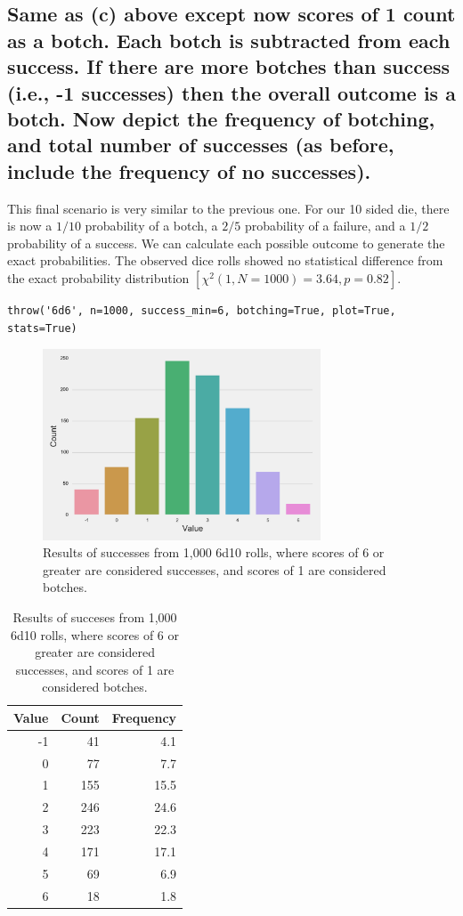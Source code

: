 \documentclass[twocolumn,letterpaper]{article}  %
\begin{document}
\subsection{Same as (c) above except now scores of 1 count as a botch. Each botch is subtracted from each success. If there are more botches than success (i.e., -1 successes) then the overall outcome is a botch. Now depict the frequency of botching, and total number of successes (as before, include the frequency of no successes).}

This final scenario is very similar to the previous one. For our 10 sided die, there is now a $1/10$ probability of a botch, a $2/5$ probability of a failure, and a $1/2$ probability of a success. We can calculate each possible outcome to generate the exact probabilities. The observed dice rolls showed no statistical difference from the exact probability distribution $[\chi^2 (1,N=1000)=3.64, p=0.82]$.

\begin{lstlisting}
throw('6d6', n=1000, success_min=6, botching=True, plot=True, stats=True)
\end{lstlisting}
\begin{figure}[h!]
\centering
\includegraphics[width=3.25in]{6d10_min6_botching.pdf}
\caption{Results of successes from 1,000 6d10 rolls, where scores of 6 or greater are considered successes, and scores of 1 are considered botches.}
\end{figure}

\begin{table}[h!]
\begin{center}
\begin{tabular}{*{3}{r}}
\toprule
Value & Count & Frequency \\
\midrule
    -1 &    41 &       4.1 \\
     0 &    77 &       7.7 \\
     1 &   155 &      15.5 \\
     2 &   246 &      24.6 \\
     3 &   223 &      22.3 \\
     4 &   171 &      17.1 \\
     5 &    69 &       6.9 \\
     6 &    18 &       1.8 \\
\bottomrule
\end{tabular}
\end{center}
\caption{Results of succeses from 1,000 6d10 rolls, where scores of 6 or greater are considered successes, and scores of 1 are considered botches.}
\end{table}
\end{document}
